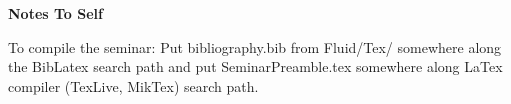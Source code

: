 

\cfoot{\thepage}								      %
\renewcommand{\headrulewidth}{0.0cm}			%
\renewcommand{\footrulewidth}{0.0cm}			%
\lstset{language=bash,basicstyle=\small\sffamily}



\begin{center}
   \textbf{\LARGE{Notes To Self}}\\[0.5cm]
\end{center}

To compile the seminar: Put bibliography.bib from Fluid/Tex/ somewhere along the BibLatex search path and put SeminarPreamble.tex somewhere along LaTex compiler (TexLive, MikTex) search path.

